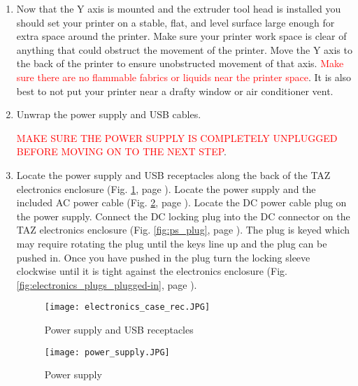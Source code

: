 \begin{enumerate}
\item Now that the Y axis is mounted and the extruder tool head is installed you should set your printer on a stable, flat, and level surface large enough for extra space around the printer. Make sure your printer work space is clear of anything that could obstruct the movement of the printer. Move the Y axis to the back of the printer to ensure unobstructed movement of that axis. \textcolor{red}{Make sure there are no flammable fabrics or liquids near the printer space}. It is also best to not put your printer near a drafty window or air conditioner vent.

\item Unwrap the power supply and USB cables.

\textcolor{red}{MAKE SURE THE POWER SUPPLY IS COMPLETELY UNPLUGGED BEFORE MOVING ON TO THE NEXT STEP}.

\item Locate the power supply and USB receptacles along the back of the TAZ electronics enclosure
(Fig. \ref{fig:electronics_plugs}, page \pageref{fig:electronics_plugs}). Locate the power supply and the included AC power cable (Fig. \ref{fig:power_supply}, page \pageref{fig:power_supply}). Locate the DC power cable plug on the power supply. Connect the DC locking plug into the DC connector on the TAZ electronics enclosure (Fig. \ref{fig:ps_plug}, page \pageref{fig:ps_plug}). The plug is keyed which may require rotating the plug until the keys line up and the plug can be pushed in. Once you have pushed in the plug turn the locking sleeve clockwise until it is tight against the electronics enclosure (Fig. \ref{fig:electronics_plugs_plugged-in}, page \pageref{fig:electronics_plugs_plugged-in}).
\begin{figure}[H]
\centering
\texttt{[image: electronics\_case\_rec.JPG]}
\caption{Power supply and USB receptacles}
\label{fig:electronics_plugs}
\end{figure}

\begin{figure}[H]
\centering
\texttt{[image: power\_supply.JPG]}
\caption{Power supply}
\label{fig:power_supply}
\end{figure}


\end{enumerate}
